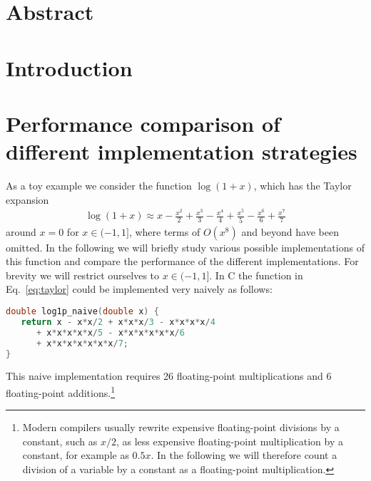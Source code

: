 \documentclass[10pt,DIV16,twocolumn]{scrartcl}
\title{\mytitle}
\author{\myauthor}
\affil{Fachbereich Energie und Biotechnologie, Hochschule Flensburg,\\ Kanzleistra{\ss}e 91--93, 24943 Flensburg, Germany}
\date{\today}
\begin{document}
\maketitle

\section*{Abstract}

\section{Introduction}

\cite{polylogarithm}

\section{Performance comparison of different implementation strategies}

As a toy example we consider the function $\log(1+x)$, which has the
Taylor expansion
%
\begin{align}
  \log(1+x) \approx x - \frac{x^2}{2} + \frac{x^3}{3} - \frac{x^4}{4} + \frac{x^5}{5} - \frac{x^6}{6} + \frac{x^7}{7}
  \label{eq:taylor}
\end{align}
%
around $x=0$ for $x\in(-1,1]$, where terms of $O(x^8)$ and beyond have
been omitted.  In the following we will briefly study various possible
implementations of this function and compare the performance of the
different implementations.  For brevity we will restrict ourselves to
$x\in(-1,1]$.  In C the function in Eq.~\eqref{eq:taylor} could be
implemented very naively as follows:
%
\begin{lstlisting}[language=C]
double log1p_naive(double x) {
   return x - x*x/2 + x*x*x/3 - x*x*x*x/4
      + x*x*x*x*x/5 - x*x*x*x*x*x/6
      + x*x*x*x*x*x*x/7;
}
\end{lstlisting}
%
This naive implementation requires 26 floating-point multiplications
and 6 floating-point additions.\footnote{Modern compilers usually
  rewrite expensive floating-point divisions by a constant, such as
  $x/2$, as less expensive floating-point multiplication by a
  constant, for example as $0.5x$.  In the following we will therefore
  count a division of a variable by a constant as a floating-point
  multiplication.}
\end{document}
